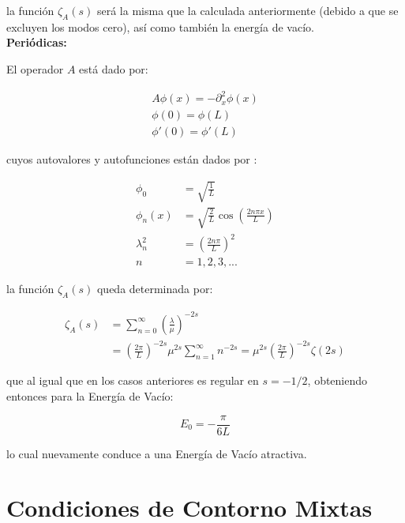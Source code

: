 la función $\zeta _A (s)$ será la misma que la calculada anteriormente (debido a que se excluyen los modos cero), así como también la energía de vacío. \\

\textbf{Periódicas:}

El operador $A$ está dado por:

\begin{equation}
\begin{array}{c}
	A \phi (x) = - \partial _x ^2 \phi (x) \\[5pt]
    \phi (0) = \phi (L)  \\[5pt]
    \phi ' (0) = \phi ' (L)
\end{array}
\end{equation}

cuyos autovalores y autofunciones están dados por  : 

\begin{equation}
\begin{aligned}
	\phi _{0} &= \sqrt{\frac{1}{L}} \\[5pt]
	\phi _{n} (x) &= \sqrt{\frac{2}{L}} \cos \left( \frac{2 n \pi x}{L} \right) \\[5pt]
	\lambda _n ^2 &= \left( \frac{2 n \pi }{L} \right) ^2 \\[5pt]
	n &= 1,2,3, ...
\end{aligned}
\end{equation}

la función $\zeta _A (s)$ queda determinada por:

\begin{equation}
\begin{aligned}
\zeta _A (s) &= 
\sum _{n=0} ^{\infty} \left( \frac{\lambda}{\mu} \right)^{-2s} \\[5pt]
&=  \left( \frac{2 \pi}{L} \right) ^{-2s} \mu ^{2s} \sum _{n=1} ^{\infty} n ^{-2s} =  
\mu ^{2s} \left( \frac{2 \pi}{L} \right) ^{-2s} \zeta (2s)
\end{aligned}
\end{equation}

que al igual que en los casos anteriores es regular en $s=-1/2$, obteniendo entonces para la Energía de Vacío:

\begin{equation}
E _0 = - \frac{\pi}{6 L}
\end{equation}

lo cual nuevamente conduce a una Energía de Vacío atractiva.

\section{Condiciones de Contorno Mixtas}

